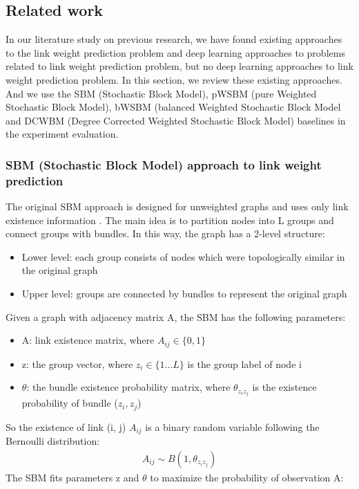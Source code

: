 \documentclass{article}
\begin{document}
\subsection{Related work}
In our literature study on previous research,
we have found existing approaches to the link weight prediction problem
and deep learning approaches to problems related to link weight prediction problem,
but no deep learning approaches to link weight prediction problem.
In this section, we review these existing approaches.
And we use the SBM (Stochastic Block Model),
pWSBM (pure Weighted Stochastic Block Model),
bWSBM (balanced Weighted Stochastic Block Model and
DCWBM (Degree Corrected Weighted Stochastic Block Model)
baselines in the experiment evaluation.

\subsubsection{SBM (Stochastic Block Model) approach to link weight prediction}
The original SBM approach is designed for unweighted graphs and uses only link existence information \cite{holland1983stochastic}.
The main idea is to partition nodes into L groups and connect groups with bundles.
In this way, the graph has a 2-level structure:
\begin{itemize}
	\item Lower level: each group consists of nodes which were topologically similar in the original graph
	\item Upper level: groups are connected by bundles
	to represent the original graph
\end{itemize}
Given a graph with adjacency matrix A, the SBM has the following parameters:
\begin{itemize}
	\item A: link existence matrix, where $ A_{ij} \in \{0, 1\} $
	\item z: the group vector,
	where $ z_i \in \{ 1 ... L \} $ is the group label of node i
	\item $ \theta $: the bundle existence probability matrix,
	where $ \theta_{z_i z_j} $ is the existence probability of bundle ($z_i, z_j$)
\end{itemize}
So the existence of link (i, j) $ A_{ij} $ is a binary random variable following the Bernoulli distribution:
\begin{align*}
	A_{ij} \sim B(1, \theta_{z_i z_j})
\end{align*}
The SBM fits parameters z and $ \theta $
to maximize the probability of observation A:
\end{document}
